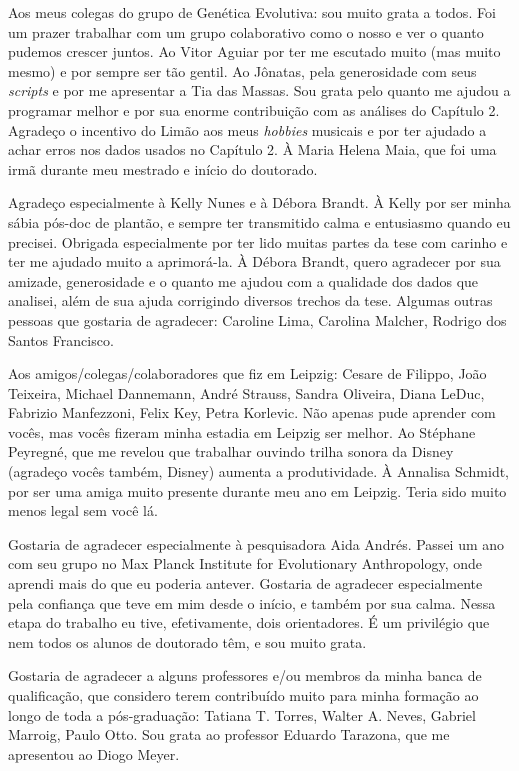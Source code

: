 Aos meus colegas do grupo de Genética Evolutiva: sou muito grata a todos. Foi um prazer trabalhar com um grupo colaborativo como o nosso e ver o quanto pudemos crescer juntos. Ao Vitor Aguiar por ter me escutado muito (mas muito mesmo) e por sempre ser tão gentil. Ao Jônatas, pela generosidade com seus \emph{scripts} e por me apresentar a Tia das Massas. Sou grata pelo quanto me ajudou a programar melhor e por sua enorme contribuição com as análises do Capítulo 2. Agradeço o incentivo do Limão aos meus \emph{hobbies} musicais e por ter ajudado a achar erros nos dados usados no Capítulo 2. À Maria Helena Maia, que foi uma irmã durante meu mestrado e início do doutorado.

Agradeço especialmente à Kelly Nunes e à Débora Brandt. À Kelly por ser minha sábia pós-doc de plantão, e sempre ter transmitido calma e entusiasmo quando eu precisei. Obrigada especialmente por ter lido muitas partes da tese com carinho e ter me ajudado muito a aprimorá-la. À Débora Brandt, quero agradecer por sua amizade, generosidade e o quanto me ajudou com a qualidade dos dados que analisei, além de sua ajuda corrigindo diversos trechos da tese. Algumas outras pessoas que gostaria de agradecer: Caroline Lima, Carolina Malcher, Rodrigo dos Santos Francisco.

Aos amigos/colegas/colaboradores que fiz em Leipzig: Cesare de Filippo, João Teixeira, Michael Dannemann, André Strauss, Sandra Oliveira, Diana LeDuc, Fabrizio Manfezzoni, Felix Key, Petra Korlevic. Não apenas pude aprender com vocês, mas vocês fizeram minha estadia em Leipzig ser melhor. Ao Stéphane Peyregné, que me revelou que trabalhar ouvindo trilha sonora da Disney (agradeço vocês também, Disney) aumenta a produtividade. À Annalisa Schmidt, por ser uma amiga muito presente durante meu ano em Leipzig. Teria sido muito menos legal sem você lá. 

Gostaria de agradecer especialmente à pesquisadora Aida Andrés. Passei um ano com seu grupo no Max Planck Institute for Evolutionary Anthropology, onde aprendi mais do que eu poderia antever. Gostaria de agradecer especialmente pela confiança que teve em mim desde o início, e também por sua calma. Nessa etapa do trabalho eu tive, efetivamente, dois orientadores. É um privilégio que nem todos os alunos de doutorado têm, e sou muito grata.

Gostaria de agradecer a alguns professores e/ou membros da minha banca de qualificação, que considero terem contribuído muito para minha formação ao longo de toda a pós-graduação: Tatiana T. Torres, Walter A. Neves, Gabriel Marroig, Paulo Otto. Sou grata ao professor Eduardo Tarazona, que me apresentou ao Diogo Meyer.

